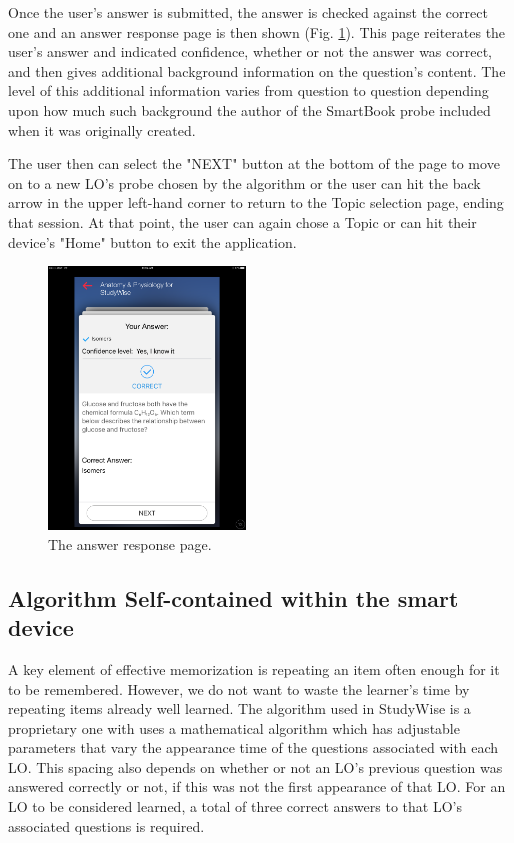 \documentclass[runningheads,a4paper]{llncs}
\begin{document}
Once the user's answer is submitted, the answer is checked against the correct one and an answer response page is then shown (Fig. \ref{fig:AnswerResponse}).  This page reiterates the user's answer and indicated confidence, whether or not the answer was correct, and then gives additional background information on the question's content.  The level of this additional information varies from question to question depending upon how much such background the author of the SmartBook probe included when it was originally created.  

The user then can select the "NEXT" button at the bottom of the page to move on to a new LO's probe chosen by the algorithm or the user can hit the back arrow in the upper left-hand corner to return to the Topic selection page, ending that session.  At that point, the user can again chose a Topic or can hit their device's "Home" button to exit the application.

\begin{figure}
\centering
\includegraphics[height=2.75in]{StudyWise_Answer_Response_Page}
\caption{The answer response page.}
\label{fig:AnswerResponse}
\end{figure}
  
\subsection{Algorithm Self-contained within the smart device}   
  
A key element of effective memorization is repeating an item often enough for it to be remembered.  However, we do not want to waste the learner's time by repeating items already well learned.  The algorithm used in StudyWise is a proprietary one with uses a mathematical algorithm which has adjustable parameters that vary the appearance time of the questions associated with each LO.  This spacing also depends on whether or not an LO's previous question was answered correctly or not, if this was not the first appearance of that LO.  For an LO to be considered learned, a total of three correct answers to that LO's associated questions is required.
\end{document}
